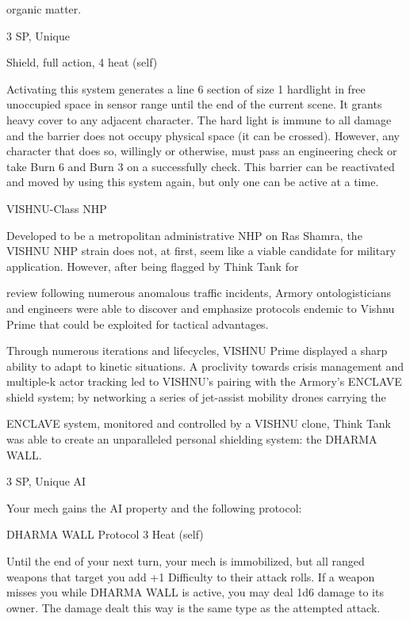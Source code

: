 organic matter.

3 SP, Unique

Shield, full action, 4 heat (self)

Activating this system generates a line 6 section of size 1 hardlight in free unoccupied space in
sensor range until the end of the current scene. It grants heavy cover to any adjacent character.
The hard light is immune to all damage and the barrier does not occupy physical space (it can be
crossed). However, any character that does so, willingly or otherwise, must pass an engineering
check or take Burn 6 and Burn 3 on a successfully check. This barrier can be reactivated and
moved by using this system again, but only one can be active at a time.


VISHNU-Class NHP

Developed to be a metropolitan administrative NHP on Ras Shamra, the VISHNU NHP strain does not, at
first, seem like a viable candidate for military application. However, after being flagged by Think Tank for

review following numerous anomalous traffic incidents, Armory ontologisticians and engineers were able to
discover and emphasize protocols endemic to Vishnu Prime that could be exploited for tactical advantages.




Through numerous iterations and lifecycles, VISHNU Prime displayed a sharp ability to adapt to kinetic
situations. A proclivity towards crisis management and multiple-k actor tracking led to VISHNU’s pairing
with the Armory’s ENCLAVE shield system; by networking a series of jet-assist mobility drones carrying the

ENCLAVE system, monitored and controlled by a VISHNU clone, Think Tank was able to create an
unparalleled personal shielding system: the DHARMA WALL.


3 SP, Unique
AI

Your mech gains the AI property and the following protocol:


         DHARMA WALL
         Protocol
         3 Heat (self)

         Until the end of your next turn, your mech is immobilized, but all ranged weapons that
         target you add +1 Difficulty to their attack rolls. If a weapon misses you while DHARMA
         WALL is active, you may deal 1d6 damage to its owner. The damage dealt this way is the
         same type as the attempted attack.



